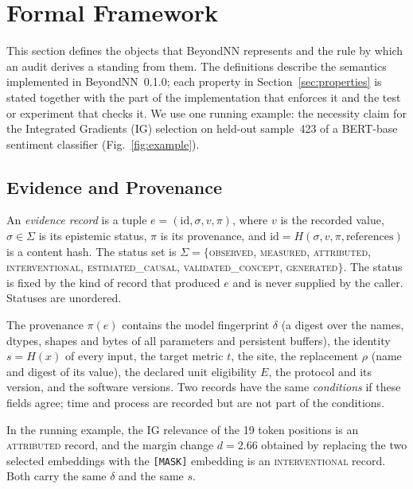 \section{Formal Framework}
\label{sec:framework}

This section defines the objects that BeyondNN represents and the rule by which an audit derives a standing from them. The definitions describe the semantics implemented in BeyondNN~0.1.0; each property in Section~\ref{sec:properties} is stated together with the part of the implementation that enforces it and the test or experiment that checks it. We use one running example: the necessity claim for the Integrated Gradients (IG) selection on held-out sample~423 of a BERT-base sentiment classifier (Fig.~\ref{fig:example}).

\subsection{Evidence and Provenance}

\begin{definition}
An \emph{evidence record} is a tuple $e=(\mathrm{id},\sigma,v,\pi)$, where $v$ is the recorded value, $\sigma\in\Sigma$ is its epistemic status, $\pi$ is its provenance, and $\mathrm{id}=H(\sigma,v,\pi,\text{references})$ is a content hash. The status set is
$\Sigma=\{$\textsc{observed}, \textsc{measured}, \textsc{attributed}, \textsc{interventional}, \textsc{estimated\_causal}, \textsc{validated\_concept}, \textsc{generated}$\}$.
The status is fixed by the kind of record that produced $e$ and is never supplied by the caller. Statuses are unordered.
\end{definition}

\begin{definition}[Provenance]
The provenance $\pi(e)$ contains the model fingerprint $\delta$ (a digest over the names, dtypes, shapes and bytes of all parameters and persistent buffers), the identity $s=H(x)$ of every input, the target metric $t$, the site, the replacement $\rho$ (name and digest of its value), the declared unit eligibility $E$, the protocol and its version, and the software versions. Two records have the same \emph{conditions} if these fields agree; time and process are recorded but are not part of the conditions.
\end{definition}

In the running example, the IG relevance of the 19 token positions is an \textsc{attributed} record, and the margin change $d=2.66$ obtained by replacing the two selected embeddings with the \texttt{[MASK]} embedding is an \textsc{interventional} record. Both carry the same $\delta$ and the same $s$.

